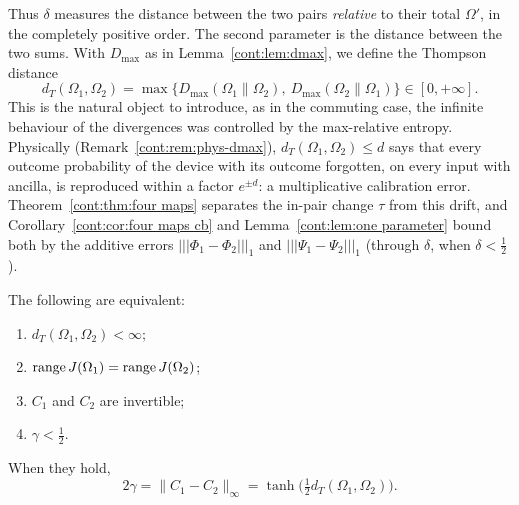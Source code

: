 Thus $\delta$ measures the distance between the two pairs \emph{relative} to their total $\Omega'$, in the completely positive order. The second parameter is the distance between the two sums. With $D_{\max}$ as in Lemma~\ref{cont:lem:dmax}, we define the Thompson distance
\[
d_T(\Omega_1,\Omega_2)=\max\big\{D_{\max}(\Omega_1\|\Omega_2),\ D_{\max}(\Omega_2\|\Omega_1)\big\}\in[0,+\infty].
\]
This is the natural object to introduce, as in the commuting case, the infinite behaviour of the divergences was controlled by the max-relative entropy. Physically (Remark~\ref{cont:rem:phys-dmax}), $d_T(\Omega_1,\Omega_2)\leq d$ says that every outcome probability of the device with its outcome forgotten, on every input with ancilla, is reproduced within a factor $e^{\pm d}$: a multiplicative calibration error. Theorem~\ref{cont:thm:four maps} separates the in-pair change $\tau$ from this drift, and Corollary~\ref{cont:cor:four maps cb} and Lemma~\ref{cont:lem:one parameter} bound both by the additive errors $|||\Phi_1-\Phi_2|||_1$ and $|||\Psi_1-\Psi_2|||_1$ (through $\delta$, when $\delta<\frac12$).
\begin{lemma}\label{cont:lem:thompson}
The following are equivalent:
\begin{enumerate}
\item[(i)] $d_T(\Omega_1,\Omega_2)<\infty$;
\item[(ii)] $\operatorname{range} J(\Omega_1)=\operatorname{range} J(\Omega_2)$;
\item[(iii)] $C_1$ and $C_2$ are invertible;
\item[(iv)] $\gamma<\frac12$.
\end{enumerate}
When they hold,
\[
2\gamma=\|C_1-C_2\|_\infty=\tanh\big(\tfrac12d_T(\Omega_1,\Omega_2)\big).
\]
\end{lemma}

